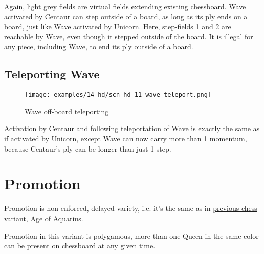 Again, light grey fields are virtual fields extending existing chessboard.
Wave activated by Centaur can step outside of a board, as long as its ply
ends on a board, just like
\hyperref[fig:scn_mv_26_wave_off_board]{Wave activated by Unicorn}. Here,
step-fields 1 and 2 are reachable by Wave, even though it stepped outside
of the board. It is illegal for any piece, including Wave, to end its ply
outside of a board.

\clearpage %

\subsection*{Teleporting Wave}

\vspace*{-1.2\baselineskip}
\noindent
\begin{figure}[!h]
\texttt{[image: examples/14\_hd/scn\_hd\_11\_wave\_teleport.png]}
\caption{Wave off-board teleporting}
\label{fig:scn_hd_11_wave_teleport}
\end{figure}

Activation by Centaur and following teleportation of Wave is
\hyperref[fig:scn_n_07_teleport_wave_init]{exactly the same as if activated by Unicorn},
except Wave can now carry more than 1 momentum, because Centaur's ply can be
longer than just 1 step.

\clearpage %

\section*{Promotion}

Promotion is non enforced, delayed variety, i.e. it's the same as in
\hyperref[sec:Age of Aquarius/Promotion]{previous chess variant}, Age of Aquarius.

Promotion in this variant is polygamous, more than one Queen in the same color
can be present on chessboard at any given time.

\clearpage %

